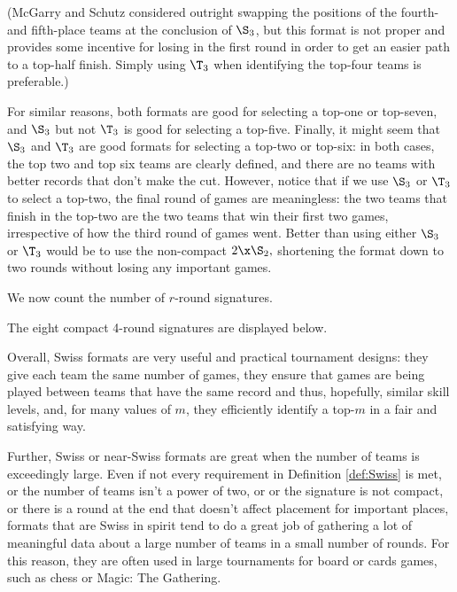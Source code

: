 {    (McGarry and Schutz \cite{four_five_swap} considered outright swapping the positions of the fourth- and fifth-place teams at the conclusion of $\S_3$, but this format is not proper and provides some incentive for losing in the first round in order to get an easier path to a top-half finish. Simply using $\T_3$ when identifying the top-four teams is preferable.)

    For similar reasons, both formats are good for selecting a top-one or top-seven, and $\S_3$ but not $\T_3$ is good for selecting a top-five. Finally, it might seem that $\S_3$ and $\T_3$ are good formats for selecting a top-two or top-six: in both cases, the top two and top six teams are clearly defined, and there are no teams with better records that don't make the cut. However, notice that if we use $\S_3$ or $\T_3$ to select a top-two, the final round of games are meaningless: the two teams that finish in the top-two are the two teams that win their first two games, irrespective of how the third round of games went. Better than using either $\S_3$ or $\T_3$ would be to use the non-compact $2\x\S_2,$ shortening the format down to two rounds without losing any important games.

    We now count the number of $r$-round signatures.


    The eight compact 4-round signatures are displayed below.

    
    Overall, Swiss formats are very useful and practical tournament designs: they give each team the same number of games, they ensure that games are being played between teams that have the same record and thus, hopefully, similar skill levels, and, for many values of $m$, they efficiently identify a top-$m$ in a fair and satisfying way.

    Further, Swiss or near-Swiss formats are great when the number of teams is exceedingly large. Even if not every requirement in Definition \ref{def:Swiss} is met, or the number of teams isn't a power of two, or or the signature is not compact, or there is a round at the end that doesn't affect placement for important places, formats that are Swiss in spirit tend to do a great job of gathering a lot of meaningful data about a large number of teams in a small number of rounds. For this reason, they are often used in large tournaments for board or cards games, such as chess or Magic: The Gathering.

}